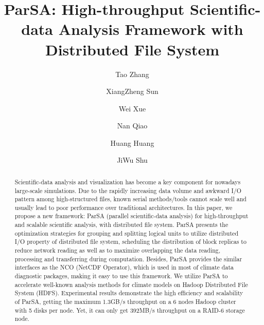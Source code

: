 \documentclass[preprint,12pt]{elsarticle}
\begin{document}
\begin{frontmatter}



\title{ParSA: High-throughput Scientific-data Analysis Framework with Distributed File System}



\author[1]{Tao Zhang}
\author[2]{XiangZheng Sun}
\author[1]{Wei Xue}
\author[2]{Nan Qiao}
\author[1]{Huang Huang}
\author[1]{JiWu Shu}
\address[1]{Department of Computer Science and Technology, Tsinghua University, Beijing, China}
\address[2]{Intel Corporation, Beijing, China}

\begin{abstract}
Scientific-data analysis and visualization has become a key component for nowadays large-scale simulations. Due to the rapidly
increasing data volume and awkward I/O pattern among high-structured files, known serial methods/tools cannot scale well and 
usually lead to poor performance over traditional architectures. In this paper, we propose a new framework: ParSA 
(parallel scientific-data analysis) for high-throughput and scalable scientific analysis, with distributed file system. ParSA
presents the optimization strategies for grouping and splitting logical units to utilize distributed I/O property of distributed 
file system, scheduling the distribution of block replicas to reduce network reading as well as to maximize overlapping the data reading, 
processing and transferring during computation. Besides, ParSA provides the similar interfaces as the NCO (NetCDF Operator), which is 
used in most of climate data diagnostic packages, making it easy to use this framework. We utilize ParSA to accelerate well-known 
analysis methods for climate models on Hadoop Distributed File System (HDFS). Experimental results demonstrate the high efficiency and 
scalability of ParSA, getting the maximum 1.3GB/s throughput on a 6 nodes Hadoop cluster with 5 disks per node. Yet, it can only get 392MB/s
throughput on a RAID-6 storage node. 
\end{abstract}


\end{frontmatter}
\end{document}
